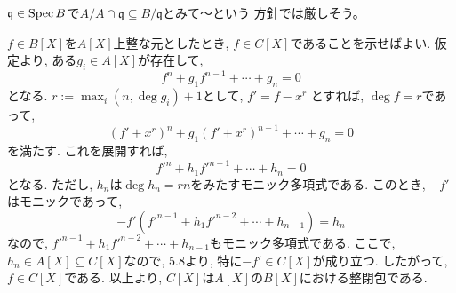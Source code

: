 \documentclass[dvipdfmx]{jsarticle}
\begin{document}
    \begin{note}
        $\mathfrak{q} \in \operatorname{Spec}{B}$で$A/A\cap\mathfrak{q} \subseteq B/\mathfrak{q}$とみて～という
        方針では厳しそう。
    \end{note}

    \begin{problem}
        $f \in B[X]$を$A[X]$上整な元としたとき, $f \in C[X]$であることを示せばよい.
        仮定より, ある$g_i \in A[X]$が存在して,
        \[
            f^n + g_1 f^{n-1} + \cdots + g_n = 0
        \]
        となる.
        $r := \max_i(n, \deg{g_i}) + 1$として, $f' = f - x^r$
        とすれば, $\deg{f} = r$であって,
        \[
            (f' + x^r)^n + g_1 (f' + x^r)^{n-1} + \cdots + g_n = 0
        \]
        を満たす.
        これを展開すれば,
        \[
            f'^n + h_1f'^{n-1} + \cdots + h_n = 0
        \]
        となる.
        ただし, $h_n$は$\deg{h_n} = rn$をみたすモニック多項式である.
        このとき, $-f'$はモニックであって,
        \[
            -f'(f'^{n-1} + h_1f'^{n-2} + \cdots + h_{n-1}) = h_n
        \]
        なので, $f'^{n-1} + h_1f'^{n-2} + \cdots + h_{n-1}$もモニック多項式である.
        ここで, $h_n \in A[X] \subseteq C[X]$なので, 5.8より,
        特に$-f' \in C[X]$が成り立つ.
        したがって, $f \in C[X]$である.
        以上より, $C[X]$は$A[X]$の$B[X]$における整閉包である.
    \end{problem}
\end{document}
